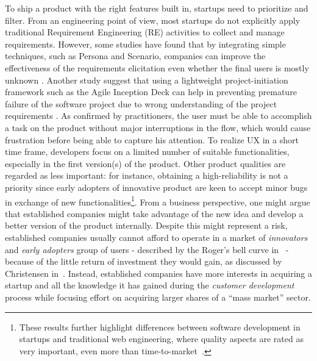\documentclass[10pt,journal,letterpaper,compsoc]{IEEEtran}
\begin{document}
To ship a product with the right features built in, startups need to prioritize and filter. From an engineering point of view, most startups do not explicitly apply traditional Requirement Engineering (RE) activities to collect and manage requirements. However, some studies have found that by integrating simple techniques, such as Persona and Scenario, companies can improve the effectiveness of the requirements elicitation even whether the final users is mostly unknown \cite{1531030}. Another study suggest that using a lightweight project-initiation framework such as the Agile Inception Deck can help in preventing premature failure of the software project due to wrong understanding of the project requirements \cite{1667597}.
As confirmed by practitioners, the user must be able to accomplish a task on 
the product without major interruptions in the flow, which would cause 
frustration before being able to capture his attention. To realize UX in a 
short time frame, developers focus on a limited number of suitable 
functionalities, especially in the first version(s) of the product. Other 
product qualities are regarded as less important: for instance, obtaining a 
high-reliability is not a priority since early adopters of innovative product 
are keen to accept minor bugs in exchange of new functionalities\footnote{These 
results further highlight differences between software development in startups 
and traditional web engineering, where quality aspects are rated as very 
important, even more than time-to-market~\cite{Offutt2002}.}. From a business 
perspective, one might argue that established companies might take advantage of 
the new idea and develop a better version of the product internally. Despite 
this might represent a risk, established companies usually cannot afford to 
operate in a market of \textit{innovators} and \textit{early adopters} group 
of users - described by the Roger's bell curve in~\cite{Rogers} - because of 
the little return of investment they would gain, as discussed by Christensen 
in~\cite{Christensen2003}. Instead, established companies have more interests 
in acquiring a startup and all the knowledge it has gained during the 
\textit{customer development} process while focusing effort on acquiring larger
shares of a ``mass market'' sector. 
\end{document}
